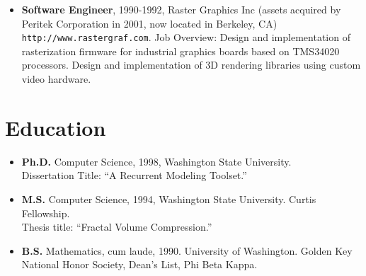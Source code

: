 \documentclass[10pt]{article}
\begin{document}
\begin{itemize}
\item {\bf Software Engineer}, 1990-1992,
Raster Graphics Inc
(assets acquired by Peritek Corporation in 2001, now
located in Berkeley, CA)
{\tt http://www.rastergraf.com}.
Job Overview: 
Design and implementation of rasterization firmware for
industrial graphics boards based on TMS34020 processors. 
Design and implementation of 3D rendering libraries using
custom video hardware.
\end{itemize}


\section*{Education}

\begin{itemize}
\item {\bf Ph.D.} Computer Science, 1998,
Washington State University. \\
Dissertation Title: ``A Recurrent Modeling Toolset.''

\item {\bf M.S.} Computer Science, 1994,
Washington State University. Curtis Fellowship. \\
Thesis title: ``Fractal Volume Compression.''


\item {\bf B.S.} Mathematics, cum laude, 1990.
University of Washington. 
Golden Key National Honor Society, Dean's List, Phi Beta Kappa.
\end{itemize}

%
\end{document}
